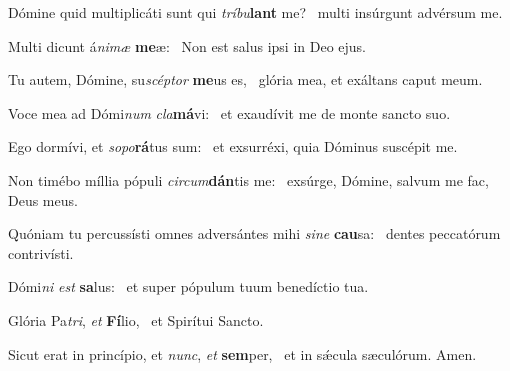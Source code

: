 \item Dómine quid multiplicáti sunt qui \textit{tríbu}\textbf{lant} me?~\psstar{} multi insúrgunt advérsum me.

\item Multi dicunt á\textit{nimæ} \textbf{me}æ:~\psstar{} Non est salus ipsi in Deo ejus.

\item Tu autem, Dómine, su\textit{scéptor} \textbf{me}us es,~\psstar{} glória mea, et exáltans caput meum.

\item Voce mea ad Dómi\textit{num} \textit{cla}\textbf{má}vi:~\psstar{} et exaudívit me de monte sancto suo.

\item Ego dormívi, et \textit{sopo}\textbf{rá}tus sum:~\psstar{} et exsurréxi, quia Dóminus suscépit me.

\item Non timébo míllia pópuli \textit{circum}\textbf{dán}tis me:~\psstar{} exsúrge, Dómine, salvum me fac, Deus meus.

\item Quóniam tu percussísti omnes adversántes mihi \textit{sine} \textbf{cau}sa:~\psstar{} dentes peccatórum contrivísti.

\item Dómi\textit{ni} \textit{est} \textbf{sa}lus:~\psstar{} et super pópulum tuum benedíctio tua.

\item Glória Pa\textit{tri}, \textit{et} \textbf{Fí}lio,~\psstar{} et Spirítui Sancto.

\item Sicut erat in princípio, et \textit{nunc}, \textit{et} \textbf{sem}per,~\psstar{} et in sǽcula sæculórum. Amen.
